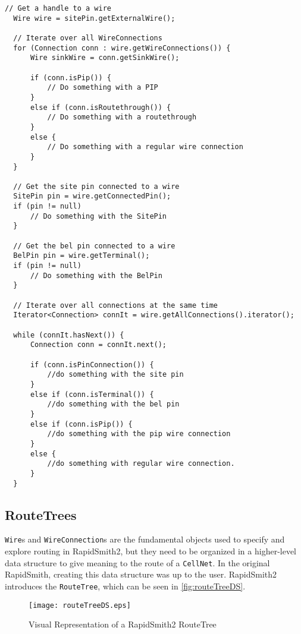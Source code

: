 \begin{lstlisting}[xleftmargin=1.5em, framexleftmargin=1.5em, caption=How to
iterate over Connections in RapidSmith2, label=code:connections] 
  // Get a handle to a wire
  Wire wire = sitePin.getExternalWire();

  // Iterate over all WireConnections
  for (Connection conn : wire.getWireConnections()) {
	  Wire sinkWire = conn.getSinkWire();

	  if (conn.isPip()) {
		  // Do something with a PIP
	  } 
	  else if (conn.isRoutethrough()) {
		  // Do something with a routethrough
	  } 
	  else {	
		  // Do something with a regular wire connection				
	  }
  }

  // Get the site pin connected to a wire
  SitePin pin = wire.getConnectedPin();
  if (pin != null)
	  // Do something with the SitePin
  }

  // Get the bel pin connected to a wire
  BelPin pin = wire.getTerminal();
  if (pin != null)
	  // Do something with the BelPin
  }

  // Iterate over all connections at the same time
  Iterator<Connection> connIt = wire.getAllConnections().iterator();

  while (connIt.hasNext()) {
	  Connection conn = connIt.next();
	
	  if (conn.isPinConnection()) {
		  //do something with the site pin
	  }
	  else if (conn.isTerminal()) {
		  //do something with the bel pin 
	  }
	  else if (conn.isPip()) {
		  //do something with the pip wire connection
	  }
	  else {
		  //do something with regular wire connection.
	  }
  }
\end{lstlisting}

\subsection{RouteTrees}

\texttt{Wire}s and \texttt{WireConnection}s are the fundamental objects used to
specify and explore routing in RapidSmith2, but they need to be organized in
a higher-level data structure to give meaning to the route of a \texttt{CellNet}.
In the original RapidSmith, creating this data structure was up to the user.
RapidSmith2 introduces the \texttt{RouteTree}, which can be seen in
\autoref{fig:routeTreeDS}.

\begin{figure}[H]
\centering
\texttt{[image: routeTreeDS.eps]}
\caption{Visual Representation of a RapidSmith2 RouteTree}
\label{fig:routeTreeDS}
\end{figure}

